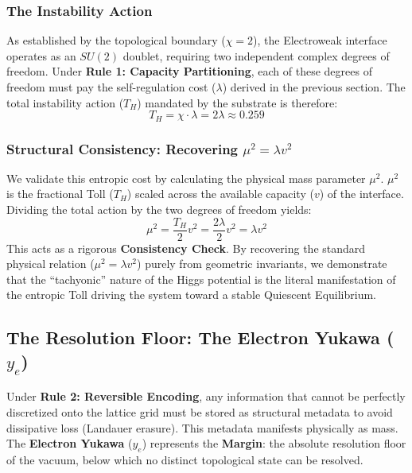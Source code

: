 \subsubsection{The Instability Action}
As established by the topological boundary ($\chi=2$), the Electroweak interface operates as an $SU(2)$ doublet, requiring two independent complex degrees of freedom. Under \textbf{Rule 1: Capacity Partitioning}, each of these degrees of freedom must pay the self-regulation cost ($\lambda$) derived in the previous section. The total instability action ($T_H$) mandated by the substrate is therefore:
\begin{equation}
T_H = \chi \cdot \lambda = 2\lambda \approx 0.259
\end{equation}

\subsubsection{Structural Consistency: Recovering \texorpdfstring{$\mu^2 = \lambda v^2$}{mu2 lambda v2}}
We validate this entropic cost by calculating the physical mass parameter $\mu^2$. $\mu^2$ is the fractional Toll ($T_H$) scaled across the available capacity ($v$) of the interface. Dividing the total action by the two degrees of freedom yields:
\begin{equation}
\mu^2 = \frac{T_H}{2} v^2 = \frac{2\lambda}{2} v^2 = \lambda v^2
\end{equation}
This acts as a rigorous \textbf{Consistency Check}. By recovering the standard physical relation ($\mu^2 = \lambda v^2$) purely from geometric invariants, we demonstrate that the ``tachyonic'' nature of the Higgs potential is the literal manifestation of the entropic Toll driving the system toward a stable Quiescent Equilibrium.

\subsection{The Resolution Floor: The Electron Yukawa (\texorpdfstring{$y_e$}{ye})}
\label{subsec:margin_electron}
Under \textbf{Rule 2: Reversible Encoding}, any information that cannot be perfectly discretized onto the lattice grid must be stored as structural metadata to avoid dissipative loss (Landauer erasure). This metadata manifests physically as mass. The \textbf{Electron Yukawa} ($y_e$) represents the \textbf{Margin}: the absolute resolution floor of the vacuum, below which no distinct topological state can be resolved.

